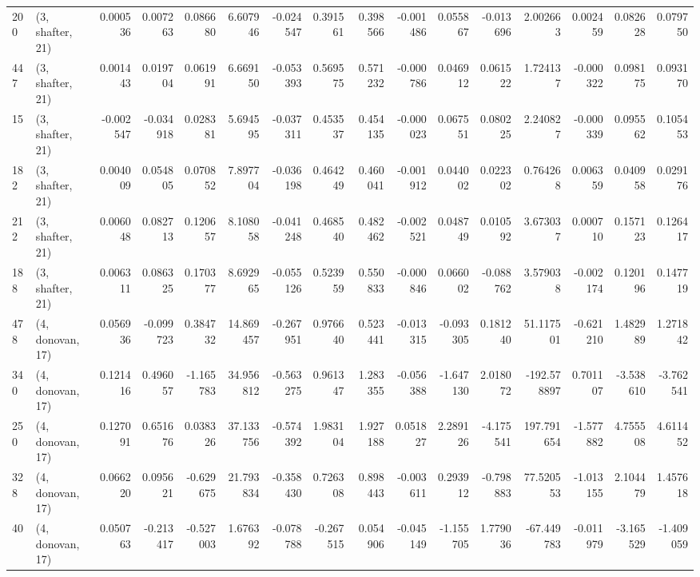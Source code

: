 \begin{tabular}{llrrrrrrrrrrrrrr}
200 &  (3, shafter, 21) &   0.000536 &  0.007263 &  0.086680 &   6.607946 & -0.024547 &   0.391561 &  0.398566 & -0.001486 &  0.055867 & -0.013696 &     2.002663 &   0.002459 &   0.082628 &   0.079750 \\
447 &  (3, shafter, 21) &   0.001443 &  0.019704 &  0.061991 &   6.669150 & -0.053393 &   0.569575 &  0.571232 & -0.000786 &  0.046912 &  0.061522 &     1.724137 &  -0.000322 &   0.098175 &   0.093170 \\
15  &  (3, shafter, 21) &  -0.002547 & -0.034918 &  0.028381 &   5.694595 & -0.037311 &   0.453537 &  0.454135 & -0.000023 &  0.067551 &  0.080225 &     2.240827 &  -0.000339 &   0.095562 &   0.105453 \\
182 &  (3, shafter, 21) &   0.004009 &  0.054805 &  0.070852 &   7.897704 & -0.036198 &   0.464249 &  0.460041 & -0.001912 &  0.044002 &  0.022302 &     0.764268 &   0.006359 &   0.040958 &   0.029176 \\
212 &  (3, shafter, 21) &   0.006048 &  0.082713 &  0.120657 &   8.108058 & -0.041248 &   0.468540 &  0.482462 & -0.002521 &  0.048749 &  0.010592 &     3.673037 &   0.000710 &   0.157123 &   0.126417 \\
188 &  (3, shafter, 21) &   0.006311 &  0.086325 &  0.170377 &   8.692965 & -0.055126 &   0.523959 &  0.550833 & -0.000846 &  0.066002 & -0.088762 &     3.579038 &  -0.002174 &   0.120196 &   0.147719 \\
478 &  (4, donovan, 17) &   0.056936 & -0.099723 &  0.384732 &  14.869457 & -0.267951 &   0.976640 &  0.523441 & -0.013315 & -0.093305 &  0.181240 &    51.117501 &  -0.621210 &   1.482989 &   1.271842 \\
340 &  (4, donovan, 17) &   0.121416 &  0.496057 & -1.165783 &  34.956812 & -0.563275 &   0.961347 &  1.283355 & -0.056388 & -1.647130 &  2.018072 &  -192.578897 &   0.701107 &  -3.538610 &  -3.762541 \\
250 &  (4, donovan, 17) &   0.127091 &  0.651676 &  0.038326 &  37.133756 & -0.574392 &   1.983104 &  1.927188 &  0.051827 &  2.289126 & -4.175541 &   197.791654 &  -1.577882 &   4.755508 &   4.611452 \\
328 &  (4, donovan, 17) &   0.066220 &  0.095621 & -0.629675 &  21.793834 & -0.358430 &   0.726308 &  0.898443 & -0.003611 &  0.293912 & -0.798883 &    77.520553 &  -1.013155 &   2.104479 &   1.457618 \\
40  &  (4, donovan, 17) &   0.050763 & -0.213417 & -0.527003 &   1.676392 & -0.078788 &  -0.267515 &  0.054906 & -0.045149 & -1.155705 &  1.779036 &   -67.449783 &  -0.011979 &  -3.165529 &  -1.409059 \\

\end{tabular}
